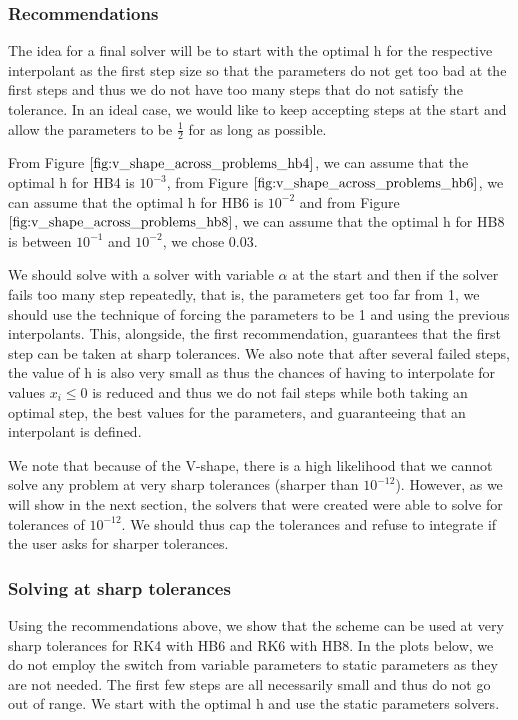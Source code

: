 \documentclass{article}
\begin{document}
\subsubsection{Recommendations}
The idea for a final solver will be to start with the optimal h for the respective interpolant as the first step size so that the parameters do not get too bad at the first steps and thus we do not have too many steps that do not satisfy the tolerance. In an ideal case, we would like to keep accepting steps at the start and allow the parameters to be $\frac{1}{2}$ for as long as possible.

From Figure $\ref{fig:v_shape_across_problems_hb4}$, we can assume that the optimal h for HB4 is $10^{-3}$, from Figure $\ref{fig:v_shape_across_problems_hb6}$, we can assume that the optimal h for HB6 is $10^{-2}$ and from Figure $\ref{fig:v_shape_across_problems_hb8}$, we can assume that the optimal h for HB8 is between $10^{-1}$ and $10^{-2}$, we chose $0.03$.

We should solve with a solver with variable $\alpha$ at the start and then if the solver fails too many step repeatedly, that is, the parameters get too far from 1, we should use the technique of forcing the parameters to be 1 and using the previous interpolants. This, alongside, the first recommendation, guarantees that the first step can be taken at sharp tolerances. We also note that after several failed steps, the value of h is also very small as thus the chances of having to interpolate for values $x_i \leq 0$ is reduced and thus we do not fail steps while both taking an optimal step, the best values for the parameters, and guaranteeing that an interpolant is defined. 

We note that because of the V-shape, there is a high likelihood that we cannot solve any problem at very sharp tolerances (sharper than $10^{-12}$). However, as we will show in the next section, the solvers that were created were able to solve for tolerances of $10^{-12}$. We should thus cap the tolerances and refuse to integrate if the user asks for sharper tolerances.

\subsubsection{Solving at sharp tolerances}
Using the recommendations above, we show that the scheme can be used at very sharp tolerances for RK4 with HB6 and RK6 with HB8. In the plots below, we do not employ the switch from variable parameters to static parameters as they are not needed. The first few steps are all necessarily small and thus do not go out of range. We start with the optimal h and use the static parameters solvers. 
\end{document}
